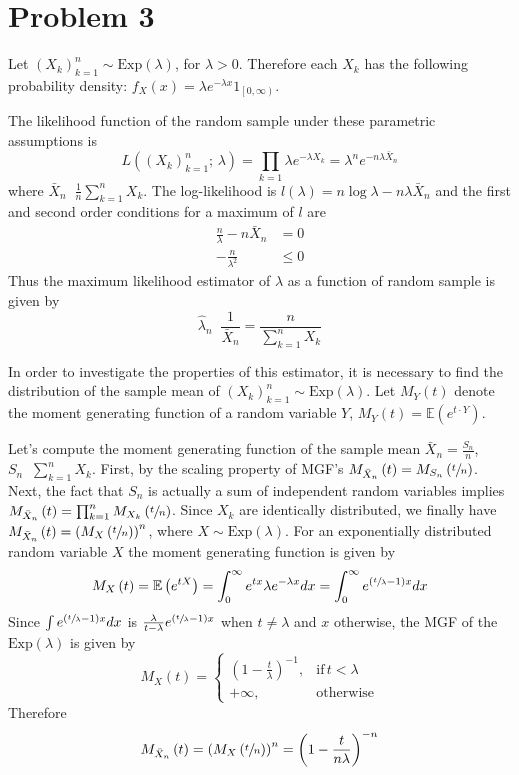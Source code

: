 \documentclass[a4paper]{article}
\newcommand{\clop}[1]{\left [ #1 \right )}
\newcommand{\brac}[1]{\left ( #1 \right )}
\newcommand{\Ex}[1]{\mathbb{E}\brac{#1}}
\newcommand{\defn}{\mathop{\overset{\Delta}{=}}\nolimits}
\begin{document}

\section{Problem 3} %
\label{sec:problem_3}

Let $\brac{X_k}_{k=1}^n\sim \text{Exp}\brac{\lambda}$, for $\lambda>0$. Therefore each $X_k$ has the following probability density: $f_X\brac{x} = \lambda e^{-\lambda x} 1_{\clop{0,\infty}}$.

The likelihood function of the random sample under these parametric assumptions is \[L\brac{\brac{X_k}_{k=1}^n;\,\lambda} = \prod_{k=1} \lambda e^{-\lambda X_k} = \lambda^n e^{-n \lambda \bar{X}_n}\] where $\bar{X}_n\defn \frac{1}{n}\sum_{k=1}^n X_k$. The log-likelihood is $l\brac{\lambda} = n\log\lambda - n\lambda \bar{X}_n$ and the first and second order conditions for a maximum of $l$ are \begin{align*}\frac{n}{\lambda} - n \bar{X}_n &= 0\\-\frac{n}{\lambda^2}&\leq 0\end{align*} Thus the maximum likelihood estimator of $\lambda$ as a function of random sample is given by \[\hat{\lambda}_n \defn \frac{1}{\bar{X}_n} = \frac{n}{\sum_{k=1}^n X_k}\]

In order to investigate the properties of this estimator, it is necessary to find the distribution of the sample mean of $\brac{X_k}_{k=1}^n\sim \text{Exp}\brac{\lambda}$. Let $M_Y\brac{t}$ denote the moment generating function of a random variable $Y$, $M_Y\brac{t} = \Ex{e^{t \cdot Y}}$.

Let's compute the moment generating function of the sample mean $\bar{X}_n = \frac{S_n}{n}$, $S_n\defn \sum_{k=1}^n X_k$. First, by the scaling property of MGF's $M_{\bar{X}_n}\brac{t} = M_{S_n}\brac{\sfrac{t}{n}}$. Next, the fact that $S_n$ is actually a sum of independent random variables implies $M_{\bar{X}_n}\brac{t} = \prod_{k=1}^n M_{X_k}\brac{\sfrac{t}{n}}$. Since $X_k$ are identically distributed, we finally have $M_{\bar{X}_n}\brac{t} = \brac{M_X\brac{\sfrac{t}{n}}}^n$, where $X\sim\text{Exp}\brac{\lambda}$. For an exponentially distributed random variable $X$ the moment generating function is given by \[M_X\brac{t} = \Ex{e^{tX}} = \int_0^\infty e^{tx} \lambda e^{-\lambda x} dx = \int_0^\infty e^{\brac{\sfrac{t}{\lambda}-1} x} dx \] Since $\int e^{\brac{\sfrac{t}{\lambda}-1} x} dx$ is $\frac{\lambda}{t-\lambda} e^{ \brac{\sfrac{t}{\lambda}-1} x}$ when $t\neq \lambda$ and $x$ otherwise, the MGF of the $\text{Exp}\brac{\lambda}$ is given by \[M_X\brac{t}=\begin{cases} \brac{1-\frac{t}{\lambda}}^{-1}, &\text{if}\, t<\lambda\\ +\infty,&\text{otherwise}\end{cases}\] Therefore \[M_{\bar{X}_n}\brac{t} = \brac{M_X\brac{\sfrac{t}{n}}}^n = \brac{1-\frac{t}{n\lambda}}^{-n}\]
\end{document}
